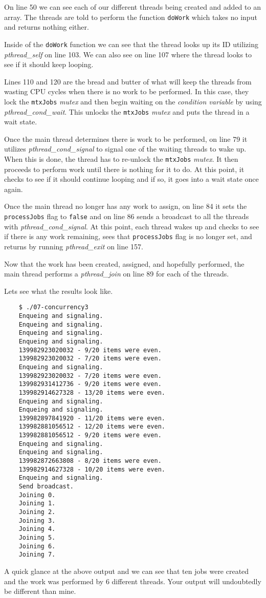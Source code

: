 \documentclass[../main.tex]{subfiles}
\begin{document}
	On line 50 we can see each of our different threads being created and added to an array.  The threads are told to perform the function \texttt{doWork} which takes no input and returns nothing either.
	
	Inside of the \texttt{doWork} function we can see that the thread looks up its ID utilizing \textit{pthread\_self} on line 103.  We can also see on line 107 where the thread looks to see if it should keep looping.
	
	Lines 110 and 120 are the bread and butter of what will keep the threads from wasting CPU cycles when there is no work to be performed.  In this case, they lock the \texttt{mtxJobs} \textit{mutex} and then begin waiting on the \textit{condition variable} by using \textit{pthread\_cond\_wait}.  This unlocks the \texttt{mtxJobs} \textit{mutex} and puts the thread in a wait state.
	
	Once the main thread determines there is work to be performed, on line 79 it utilizes \textit{pthread\_cond\_signal} to signal one of the waiting threads to wake up.  When this is done, the thread has to re-unlock the \texttt{mtxJobs} \textit{mutex}. It then proceeds to perform work until there is nothing for it to do.  At this point, it checks to see if it should continue looping and if so, it goes into a wait state once again.
	
	Once the main thread no longer has any work to assign, on line 84 it sets the \texttt{processJobs} flag to \texttt{false} and on line 86 sends a broadcast to all the threads with \textit{pthread\_cond\_signal}.  At this point, each thread wakes up and checks to see if there is any work remaining, sees that \texttt{processJobs} flag is no longer set, and returns by running \textit{pthread\_exit} on line 157.
	
	Now that the work has been created, assigned, and hopefully performed, the main thread performs a \textit{pthread\_join} on line 89 for each of the threads.
	
	Lets see what the results look like.
	
	\begin{verbatim}
	$ ./07-concurrency3 
	Enqueing and signaling.
	Enqueing and signaling.
	Enqueing and signaling.
	Enqueing and signaling.
	139982923020032 - 9/20 items were even.
	139982923020032 - 7/20 items were even.
	Enqueing and signaling.
	139982923020032 - 7/20 items were even.
	139982931412736 - 9/20 items were even.
	139982914627328 - 13/20 items were even.
	Enqueing and signaling.
	Enqueing and signaling.
	139982897841920 - 11/20 items were even.
	139982881056512 - 12/20 items were even.
	139982881056512 - 9/20 items were even.
	Enqueing and signaling.
	Enqueing and signaling.
	139982872663808 - 8/20 items were even.
	139982914627328 - 10/20 items were even.
	Enqueing and signaling.
	Send broadcast.
	Joining 0.
	Joining 1.
	Joining 2.
	Joining 3.
	Joining 4.
	Joining 5.
	Joining 6.
	Joining 7.
	\end{verbatim}
	
	A quick glance at the above output and we can see that ten jobs were created and the work was performed by 6 different threads.  Your output will undoubtedly be different than mine.
	
\end{document}
